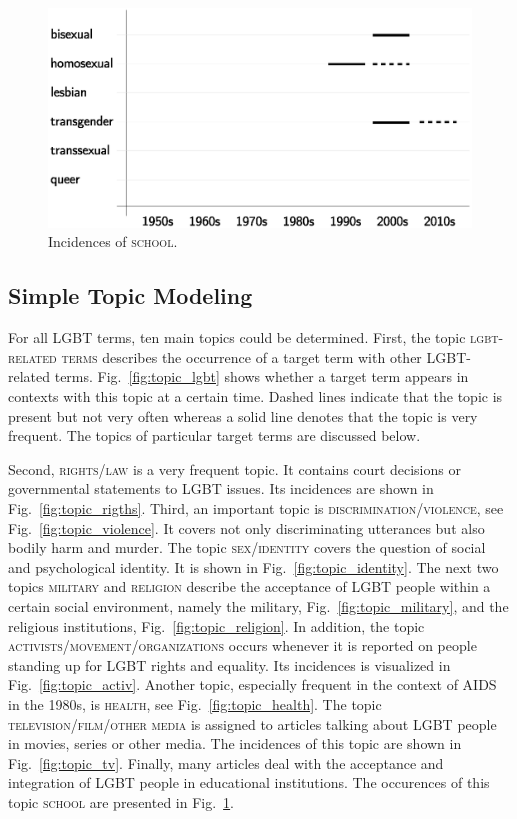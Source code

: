 \documentclass[10pt,a4paper,twocolumn]{scrartcl}
\begin{document}
\begin{figure}
\begin{minipage}{0.48\textwidth}
\includegraphics[width=\columnwidth]{figures/topic_school}
\caption{Incidences of \textsc{school}.} \label{fig:topic_school}
\end{minipage}
\end{figure}

\subsection{Simple Topic Modeling}
For all LGBT terms, ten main topics could be determined. First, the topic \textsc{lgbt-related terms} describes the occurrence of a target term with other LGBT-related terms. Fig.~\ref{fig:topic_lgbt} shows whether a target term appears in contexts with this topic at a certain time. Dashed lines indicate that the topic is present but not very often whereas a solid line denotes that the topic is very frequent. The topics of particular target terms are discussed below.

Second, \textsc{rights/law} is a very frequent topic. It contains court decisions or governmental statements to LGBT issues. Its incidences are shown in Fig.~\ref{fig:topic_rigths}. Third, an important topic is \textsc{discrimination/violence}, see Fig.~\ref{fig:topic_violence}. It covers not only discriminating utterances but also bodily harm and murder. The topic \textsc{sex/identity} covers the question of social and psychological identity. It is shown in Fig.~\ref{fig:topic_identity}. The next two topics \textsc{military} and \textsc{religion} describe the acceptance of LGBT people within a certain social environment, namely the military, Fig.~\ref{fig:topic_military}, and the religious institutions, Fig.~\ref{fig:topic_religion}. In addition, the topic \textsc{activists/movement/organizations} occurs whenever it is reported on people standing up for LGBT rights and equality. Its incidences is visualized in Fig.~\ref{fig:topic_activ}. Another topic, especially frequent in the context of AIDS in the 1980s, is \textsc{health}, see Fig.~\ref{fig:topic_health}. The topic \textsc{television/film/other media} is assigned to articles talking about LGBT people in movies, series or other media. The incidences of this topic are shown in Fig.~\ref{fig:topic_tv}. Finally, many articles deal with the acceptance and integration of LGBT people in educational institutions. The occurences of this topic \textsc{school} are presented in Fig.~\ref{fig:topic_school}.
\end{document}

